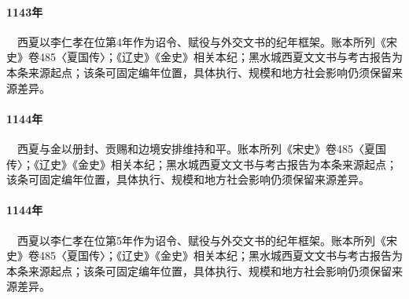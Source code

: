 \paragraph{1143年}　西夏以李仁孝在位第4年作为诏令、赋役与外交文书的纪年框架。账本所列《宋史》卷485〈夏国传〉；《辽史》《金史》相关本纪；黑水城西夏文文书与考古报告为本条来源起点；该条可固定编年位置，具体执行、规模和地方社会影响仍须保留来源差异。

\paragraph{1144年}　西夏与金以册封、贡赐和边境安排维持和平。账本所列《宋史》卷485〈夏国传〉；《辽史》《金史》相关本纪；黑水城西夏文文书与考古报告为本条来源起点；该条可固定编年位置，具体执行、规模和地方社会影响仍须保留来源差异。

\paragraph{1144年}　西夏以李仁孝在位第5年作为诏令、赋役与外交文书的纪年框架。账本所列《宋史》卷485〈夏国传〉；《辽史》《金史》相关本纪；黑水城西夏文文书与考古报告为本条来源起点；该条可固定编年位置，具体执行、规模和地方社会影响仍须保留来源差异。

